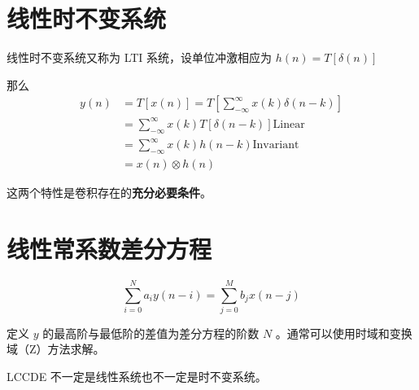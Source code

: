 \documentclass[cn,11pt,chinese,black,simple]{../elegantbook}
\begin{document}
\section{线性时不变系统}

线性时不变系统又称为 LTI 系统，设单位冲激相应为 \(h(n) = T[\delta(n)]\)

那么 \[
\begin{aligned}
    y(n) &= T[x(n)] = T[\sum_{-\infty}^\infty x(k) \delta(n-k) ] \\ 
    &= \sum_{-\infty}^\infty x(k) T[\delta(n-k)] \text{Linear} \\ 
    &= \sum_{-\infty}^{\infty} x(k) h(n-k) \text{Invariant} \\ 
    &= x(n) \otimes h(n)
\end{aligned}    
\]

这两个特性是卷积存在的\textbf{充分必要条件}。


\section{线性常系数差分方程}

\begin{definition}[线性常系数差分方程]
    \[\sum_{i=0}^{N} a_{i} y(n-i)=\sum_{j=0}^{M} b_{j} x(n-j)\]

    定义 \(y\) 的最高阶与最低阶的差值为差分方程的阶数 \(N\) 。通常可以使用时域和变换域（Z）方法求解。
\end{definition}

LCCDE 不一定是线性系统也不一定是时不变系统。



\let\chapname\undefined
\ifx\mainclass\undefined
\end{document}
